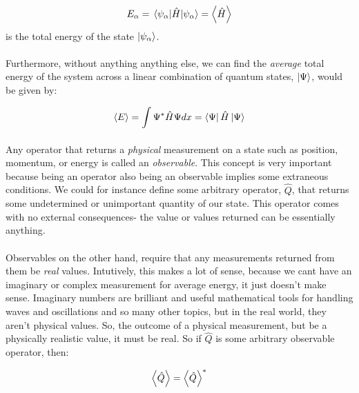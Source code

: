 \documentclass[12pt,letterpaper]{book}
\begin{document}
\begin{equation}
E_\alpha = \expval{\hat{H}}{\psi_\alpha} = \expval{\hat{H}}
\end{equation}
is the total energy of the state $\ket{\psi_\alpha}$.

\paragraph*{}Furthermore, without anything anything else, we can find the \textit{average} total energy of the system across a linear combination of quantum states, $\ket{\Psi}$, would be given by:

\begin{equation}
\label{expect-val}
\expval{E} = \int \Psi^* \hat{H} \Psi dx = \bra{\Psi}\hat{H}\ket{\Psi}	
\end{equation}

\paragraph*{}Any operator that returns a \textit{physical} measurement on a state such as position, momentum, or energy is called an \textit{observable}. This concept is very important because being an operator also being an observable implies some extraneous conditions. We could for instance define some arbitrary operator, $\hat{Q}$, that returns some undetermined or unimportant quantity of our state. This operator comes with no external consequences- the value or values returned can be essentially anything.

\paragraph*{}Observables on the other hand, require that any measurements returned from them be \textit{real} values. Intutively, this makes a lot of sense, because we cant have an imaginary or complex measurement for average energy, it just doesn't make sense. Imaginary numbers are brilliant and useful mathematical tools for handling waves and oscillations and so many other topics, but in the real world, they aren't physical values. So, the outcome of a physical measurement, but be a physically realistic value, it must be real. So if $\hat{Q}$ is some arbitrary observable operator, then:

\begin{equation}
\label{observable}
\expval{\hat{Q}} = \expval{\hat{Q}}^* 
\end{equation}
\end{document}
